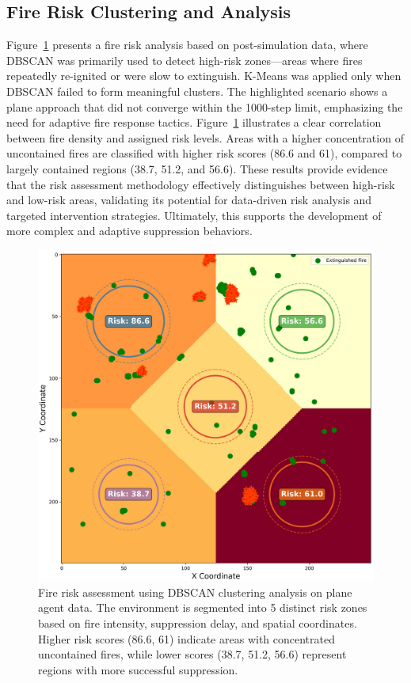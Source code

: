 \documentclass[11pt, a4paper]{article}
\begin{document}
\subsection{Fire Risk Clustering and Analysis}
\label{sec:risk_assesment}

Figure~\ref{fig:risk_assesment} presents a fire risk analysis based on post-simulation data, where DBSCAN was primarily used to detect high-risk zones—areas where fires repeatedly re-ignited or were slow to extinguish. K-Means was applied only when DBSCAN failed to form meaningful clusters. The highlighted scenario shows a plane approach that did not converge within the 1000-step limit, emphasizing the need for adaptive fire response tactics. Figure~\ref{fig:risk_assesment} illustrates a clear correlation between fire density and assigned risk levels. Areas with a higher concentration of uncontained fires are classified with higher risk scores (86.6 and 61), compared to largely contained regions (38.7, 51.2, and 56.6). These results provide evidence that the risk assessment methodology effectively distinguishes between high-risk and low-risk areas, validating its potential for data-driven risk analysis and targeted intervention strategies. Ultimately, this supports the development of more complex and adaptive suppression behaviors.

\begin{figure}[!htbp]
    \centering
    \includegraphics[width=1\linewidth]{figures/enhanced_fire_risk_analysis.jpeg}
    \caption{Fire risk assessment using DBSCAN clustering analysis on plane agent data. The environment is segmented into 5 distinct risk zones based on fire intensity, suppression delay, and spatial coordinates. Higher risk scores (86.6, 61) indicate areas with concentrated uncontained fires, while lower scores (38.7, 51.2, 56.6) represent regions with more successful suppression.}
    \label{fig:risk_assesment}
\end{figure}
\end{document}
